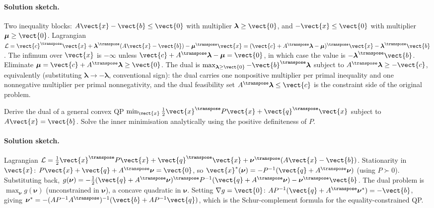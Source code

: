 \paragraph{Solution sketch.}
Two inequality blocks: $A \vect{x} - \vect{b} \leq \vect{0}$ with
multiplier $\boldsymbol{\lambda} \geq \vect{0}$, and
$-\vect{x} \leq \vect{0}$ with multiplier $\boldsymbol{\mu} \geq
\vect{0}$. Lagrangian
$\mathcal{L} = \vect{c}^{\transpose} \vect{x} +
\boldsymbol{\lambda}^{\transpose}(A \vect{x} - \vect{b})
- \boldsymbol{\mu}^{\transpose} \vect{x}
= (\vect{c} + A^{\transpose} \boldsymbol{\lambda}
- \boldsymbol{\mu})^{\transpose} \vect{x}
- \boldsymbol{\lambda}^{\transpose} \vect{b}$. The infimum over
$\vect{x}$ is $-\infty$ unless $\vect{c} + A^{\transpose}
\boldsymbol{\lambda} - \boldsymbol{\mu} = \vect{0}$, in which case
the value is $-\boldsymbol{\lambda}^{\transpose} \vect{b}$.
Eliminate $\boldsymbol{\mu} = \vect{c} + A^{\transpose}
\boldsymbol{\lambda} \geq \vect{0}$. The dual is
$\max_{\boldsymbol{\lambda} \geq \vect{0}} -\vect{b}^{\transpose}
\boldsymbol{\lambda}$ subject to $A^{\transpose} \boldsymbol{\lambda}
\geq -\vect{c}$, equivalently (substituting $\boldsymbol{\lambda}
\to -\boldsymbol{\lambda}$, conventional sign): the dual carries one
nonpositive multiplier per primal inequality and one nonnegative
multiplier per primal nonnegativity, and the dual feasibility set
$A^{\transpose} \boldsymbol{\lambda} \leq \vect{c}$ is the
constraint side of the original problem.

\begin{exercise}
Derive the dual of a general convex QP $\min_{\vect{x}}
\tfrac{1}{2} \vect{x}^{\transpose} P \vect{x} +
\vect{q}^{\transpose} \vect{x}$ subject to $A \vect{x} =
\vect{b}$. Solve the inner minimisation analytically using the
positive definiteness of $P$.
\end{exercise}

\paragraph{Solution sketch.}
Lagrangian $\mathcal{L} = \tfrac{1}{2} \vect{x}^{\transpose} P
\vect{x} + \vect{q}^{\transpose} \vect{x} +
\boldsymbol{\nu}^{\transpose}(A \vect{x} - \vect{b})$. Stationarity
in $\vect{x}$: $P \vect{x} + \vect{q} + A^{\transpose}
\boldsymbol{\nu} = \vect{0}$, so $\vect{x}^{*}(\boldsymbol{\nu}) =
-P^{-1}(\vect{q} + A^{\transpose} \boldsymbol{\nu})$ (using $P
\succ 0$). Substituting back,
$g(\boldsymbol{\nu}) = -\tfrac{1}{2}(\vect{q} + A^{\transpose}
\boldsymbol{\nu})^{\transpose} P^{-1} (\vect{q} + A^{\transpose}
\boldsymbol{\nu}) - \boldsymbol{\nu}^{\transpose} \vect{b}$. The
dual problem is $\max_{\boldsymbol{\nu}} g(\boldsymbol{\nu})$
(unconstrained in $\boldsymbol{\nu}$), a concave quadratic in
$\boldsymbol{\nu}$. Setting $\nabla g = \vect{0}$:
$A P^{-1}(\vect{q} + A^{\transpose} \boldsymbol{\nu}^{*}) =
-\vect{b}$, giving $\boldsymbol{\nu}^{*} =
-(A P^{-1} A^{\transpose})^{-1}(\vect{b} + A P^{-1} \vect{q})$,
which is the Schur-complement formula for the equality-constrained
QP.

